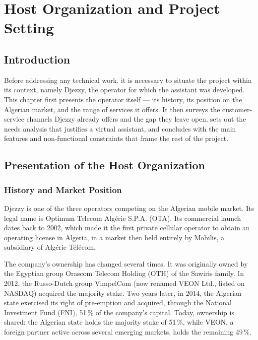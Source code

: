 \documentclass[12pt, a4paper]{report}
\newcommand{\sourced}[1]{#1}        %
\newcommand{\humantext}[1]{#1}      %
\begin{document}

\chapter{Host Organization and Project Setting}

\section{Introduction}

\humantext{Before addressing any technical work, it is necessary to situate the project within its context, namely Djezzy, the operator for which the assistant was developed.} \humantext{This chapter first presents the operator itself --- its history, its position on the Algerian market, and the range of services it offers. It then surveys the customer-service channels Djezzy already offers and the gap they leave open, sets out the needs analysis that justifies a virtual assistant, and concludes with the main features and non-functional constraints that frame the rest of the project.}

\section{Presentation of the Host Organization}

\subsection{History and Market Position}

\humantext{Djezzy is one of the three operators competing on the Algerian mobile market. Its legal name is Optimum Telecom Algérie S.P.A. (OTA).} \sourced{Its commercial launch dates back to 2002, which made it the first private cellular operator to obtain an operating license in Algeria, in a market then held entirely by Mobilis, a subsidiary of Algérie Télécom.}

\humantext{The company's ownership has changed several times.} \sourced{It was originally owned by the Egyptian group Orascom Telecom Holding (OTH) of the Sawiris family. In 2012, the Russo-Dutch group VimpelCom (now renamed VEON Ltd., listed on NASDAQ) acquired the majority stake. Two years later, in 2014, the Algerian state exercised its right of pre-emption and acquired, through the National Investment Fund (FNI), 51\,\% of the company's capital.} \humantext{Today, ownership is shared: the Algerian state holds the majority stake of 51\,\%, while VEON, a foreign partner active across several emerging markets, holds the remaining 49\,\%.}
\end{document}
